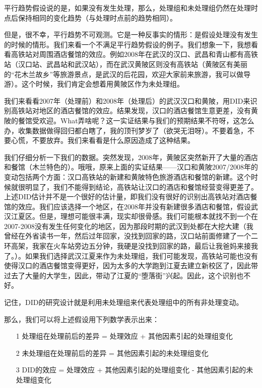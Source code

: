 \documentclass[cn,12pt,math=newtx,citestyle=gb7714-2015,bibstyle=gb7714-2015]{elegantbook}
\begin{document}
	平行趋势假设说的是，如果没有发生处理，那么，处理组和未处理组仍然在处理时点后保持相同的变化趋势（与处理时点前的趋势相同）。
	
	但是，很不幸，平行趋势不可观测。它是一种反事实的情形：是假设处理没有发生的时候的情形。我们来看一个不满足平行趋势假设的例子。我们想象一下，我想看看高铁站对周围酒店餐馆的效应。例如2008年在武汉的汉口、武昌和青山都有高铁站（汉口站、武昌站和武汉站），而在武汉黄陂区则没有高铁站（黄陂区有美丽的“花木兰故乡”等旅游景点，是武汉的后花园，欢迎大家前来旅游，我可以做导游）。这个时候，我们肯定会想着用黄陂区作为未处理组。
	
	我们来看看2007年（处理前）和2008年（处理后）的武汉汉口和黄陂，用DID来识别高铁站对地区的酒店餐馆的效应。结果发现，汉口的酒店餐馆生意更差，没有黄陂的餐馆受欢迎。What弄啥呢？这一实证结果与我们的预期结果不符呀，这怎么办，收集数据做得回归都白瞎了，我的顶刊梦岁了（欲哭无泪呀）。不要着急，不要心慌，不要放弃。我们来看看是什么原因造成了这种结果。
	
	我们仔细分析一下我们的数据。突然发现，2008年，黄陂区突然新开了大量的酒店和餐馆（木兰特色的）。哦哦，原来上面的实证结果——汉口和黄陂2007/2008年的变动包括两个方面：汉口高铁站的新建和黄陂特色旅游酒店和餐馆的新建。这个时候就很明显了，我们不能得到结论，高铁站让汉口的酒店和餐馆经营变得更差了。上述DID估计并不是一个很好的估计量，即我们没有很好的识别出高铁站对酒店餐馆的效应。我们应该选择一个地区，在2008年并没有新建很多酒店和餐馆，假设武汉江夏区。但是，理想可能很丰满，现实却很骨感。我们可能根本就找不到一个在2007-2008没有发生任何变化的地区，因为那段时期的武汉到处都在大挖大建（我曾经在外省读书一年，然后过年回家，没找到回家的路，汉口站前面修建了一个二环高架，我家在火车站旁边五分钟，我硬是没找到回家的路，最后让我爸妈来接我了。）。如果我们选择武汉江夏来作为未处理组，我们可能发现，高铁站可能也没有使得汉口的酒店餐馆变得更好，因为太多的大学跑到江夏去建立新校区了，因此带过去了大量的大学生，因此，带动了江夏的“堕落街”兴起。因此，这个识别也不好。
	
	记住，DID的研究设计就是利用未处理组来代表处理组中的所有非处理变动。
	
	那么，我们可以将上述假设用下列数学表示出来：
	
	\begin{itemize}
		\item [1] 处理组在处理前后的差异 = 处理效应 + 其他因素引起的处理组变化
		\item [2] 未处理组在处理前后的差异 = 其他因素引起的未处理组变化
		\item [3] DID的效应 = 处理效应 + 其他因素引起的处理组变化 - 其他因素引起的未处理组变化
	\end{itemize}
	
\end{document}
